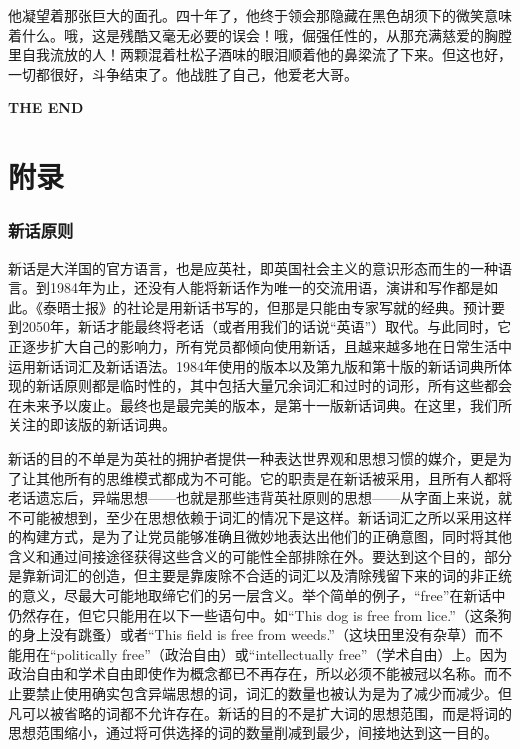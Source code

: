 他凝望着那张巨大的面孔。四十年了，他终于领会那隐藏在黑色胡须下的微笑意味着什么。哦，这是残酷又毫无必要的误会！哦，倔强任性的，从那充满慈爱的胸膛里自我流放的人！两颗混着杜松子酒味的眼泪顺着他的鼻梁流了下来。但这也好，一切都很好，斗争结束了。他战胜了自己，他爱老大哥。

\begin{center}
\textbf{THE END}
\end{center}

\part*{附录}

\section*{新话原则}\label{ux65b0ux8bddux539fux5219}

新话是大洋国的官方语言，也是应英社，即英国社会主义的意识形态而生的一种语言。到1984年为止，还没有人能将新话作为唯一的交流用语，演讲和写作都是如此。《泰晤士报》的社论是用新话书写的，但那是只能由专家写就的经典。预计要到2050年，新话才能最终将老话（或者用我们的话说``英语''）取代。与此同时，它正逐步扩大自己的影响力，所有党员都倾向使用新话，且越来越多地在日常生活中运用新话词汇及新话语法。1984年使用的版本以及第九版和第十版的新话词典所体现的新话原则都是临时性的，其中包括大量冗余词汇和过时的词形，所有这些都会在未来予以废止。最终也是最完美的版本，是第十一版新话词典。在这里，我们所关注的即该版的新话词典。

新话的目的不单是为英社的拥护者提供一种表达世界观和思想习惯的媒介，更是为了让其他所有的思维模式都成为不可能。它的职责是在新话被采用，且所有人都将老话遗忘后，异端思想——也就是那些违背英社原则的思想——从字面上来说，就不可能被想到，至少在思想依赖于词汇的情况下是这样。新话词汇之所以采用这样的构建方式，是为了让党员能够准确且微妙地表达出他们的正确意图，同时将其他含义和通过间接途径获得这些含义的可能性全部排除在外。要达到这个目的，部分是靠新词汇的创造，但主要是靠废除不合适的词汇以及清除残留下来的词的非正统的意义，尽最大可能地取缔它们的另一层含义。举个简单的例子，``free''在新话中仍然存在，但它只能用在以下一些语句中。如``This
dog is free from lice.''（这条狗的身上没有跳蚤）或者``This field is free
from weeds.''（这块田里没有杂草）而不能用在``politically
free''（政治自由）或``intellectually
free''（学术自由）上。因为政治自由和学术自由即使作为概念都已不再存在，所以必须不能被冠以名称。而不止要禁止使用确实包含异端思想的词，词汇的数量也被认为是为了减少而减少。但凡可以被省略的词都不允许存在。新话的目的不是扩大词的思想范围，而是将词的思想范围缩小，通过将可供选择的词的数量削减到最少，间接地达到这一目的。

